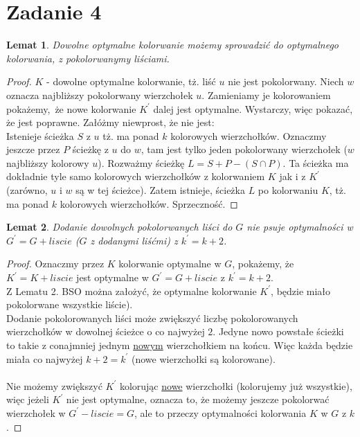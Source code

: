 \documentclass{article}
\newtheorem{lemma}{Lemat}
\begin{document}
\section{Zadanie 4}
\begin{lemma}
Dowolne optymalne kolorwanie możemy sprowadzić do optymalnego kolorwania, z pokolorwanymy liściami.
\end{lemma}
\begin{proof}
$K$ - dowolne optymalne kolorwanie, tż. liść $u$ nie jest pokolorwany. Niech $w$ oznacza najbliższy pokolorwany wierzchołek $u$. Zamieniamy je kolorowaniem pokażemy, że nowe kolorwanie $K^\prime$ dalej jest optymalne. Wystarczy, więc pokazać, że jest poprawne. Załóżmy niewprost, że nie jest:\\
Istenieje ścieżka $S$ z $u$ tż. ma ponad $k$ kolorowych wierzchołków. Oznaczmy jeszcze przez $P$ ścieżkę z $u$ do $w$, tam jest tylko jeden pokolorwany wierzchołek ($w$ najbliższy kolorowy $u$). Rozważmy ścieżkę $L = S + P - (S \cap P)$. Ta ścieżka ma dokładnie tyle samo kolorowych wierzchołków z kolorwaniem $K$ jak i z $K^\prime$ (zarówno, $u$ i $w$ są w tej ścieżce). Zatem istnieje, ścieżka $L$ po kolorwaniu $K$, tż. ma ponad $k$ kolorowych wierzchołków. Sprzeczność.
\end{proof}
\begin{lemma}
Dodanie dowolnych pokolorwanych liści do $G$ nie psuje optymalności w $G^\prime = G + liscie$ ($G$ z dodanymi liśćmi) z $k^\prime = k+2$.
\end{lemma}
\begin{proof}
Oznaczmy przez $K$ kolorwanie optymalne w $G$, pokażemy, że \\$K^\prime = K + liscie$ jest optymalne w $G^\prime = G + liscie$ z $k^\prime = k+2$.
\\Z Lematu 2. BSO można założyć, że optymalne kolorwanie $K^\prime$, będzie miało pokolorwane wszystkie liście).\\
Dodanie pokolorowanych liści może zwiększyć liczbę pokolorowanych wierzchołków
w dowolnej ścieżce o co najwyżej $2$. Jedyne nowo powstałe ścieżki to takie z conajmniej jednym \underline{nowym} wierzchołkiem na końcu. Więc każda będzie miała co najwyżej $k+2 = k^\prime$ (nowe wierzchołki są kolorowane).\\\\
Nie możemy zwiększyć $K^\prime$ kolorując \underline{nowe} wierzchołki (kolorujemy już wszystkie), więc jeżeli $K^\prime$ nie jest optymalne, oznacza to, że możemy jeszcze pokolorwać wierzchołek w $G^\prime - liscie = G$, ale to przeczy optymalności kolorwania $K$ w $G$ z $k$.
\end{proof}
\end{document}
